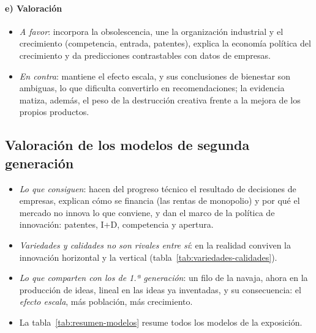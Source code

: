 \documentclass[11pt]{article}
\begin{document}
\paragraph{e) Valoración}

\begin{itemize}
\item \emph{A favor}: incorpora la obsolescencia, une la organización industrial y el crecimiento (competencia, entrada, patentes), explica la economía política del crecimiento y da predicciones contrastables con datos de empresas.
\item \emph{En contra}: mantiene el efecto escala, y sus conclusiones de bienestar son ambiguas, lo que dificulta convertirlo en recomendaciones; la evidencia matiza, además, el peso de la destrucción creativa frente a la mejora de los propios productos.
\end{itemize}

\subsection{Valoración de los modelos de segunda generación}\label{sec:sg-valoracion}

\begin{itemize}
\item \emph{Lo que consiguen}: hacen del progreso técnico el resultado de decisiones de empresas, explican cómo se financia (las rentas de monopolio) y por qué el mercado no innova lo que conviene, y dan el marco de la política de innovación: patentes, I+D, competencia y apertura.
\item \emph{Variedades y calidades no son rivales entre sí}: en la realidad conviven la innovación horizontal y la vertical (tabla~\ref{tab:variedades-calidades}).
\item \emph{Lo que comparten con los de 1.ª generación}: un filo de la navaja, ahora en la producción de ideas, lineal en las ideas ya inventadas, y su consecuencia: el \emph{efecto escala}, más población, más crecimiento.
\item La tabla~\ref{tab:resumen-modelos} resume todos los modelos de la exposición.
\end{itemize}
\end{document}
